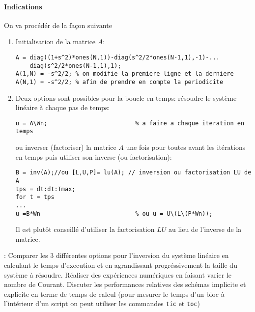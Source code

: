 \documentclass[12pt,a4paper]{article}
\begin{document}
\paragraph{Indications} On va proc\'ed\'er de la fa\c{c}on suivante
\begin{enumerate}
\item Initialisation de la matrice $A$:
\begin{verbatim}
A = diag((1+s^2)*ones(N,1))-diag(s^2/2*ones(N-1,1),-1)-...
    diag(s^2/2*ones(N-1,1),1); 
A(1,N) = -s^2/2; % on modifie la premiere ligne et la derniere
A(N,1) = -s^2/2; % afin de prendre en compte la periodicite    
\end{verbatim}
\item Deux options sont possibles pour la boucle en temps: r\'esoudre
le syst\`eme lin\'eaire \`a chaque pas de temps:
\begin{verbatim}
u = A\Wn;                         % a faire a chaque iteration en temps
\end{verbatim}
 ou inverser (factoriser) la matrice $A$ une fois pour toutes avant les it\'erations en temps puis utiliser son
inverse (ou factorisation):
\begin{verbatim}
B = inv(A);//ou [L,U,P]= lu(A); // inversion ou factorisation LU de A 
tps = dt:dt:Tmax;
for t = tps  
...
u =B*Wn                           % ou u = U\(L\(P*Wn));
\end{verbatim}
Il est plut\^ot conseill\'e d'utiliser la factorisation $LU$ au lieu
de l'inverse de la matrice.
\end{enumerate}

: Comparer les 3 diff\'erentes options pour l'inversion
du syst\`eme lin\'eaire en calculant le temps d'execution et en
agrandissant progr\'essivement la taille du syst\`eme \`a r\'esoudre. R\'ealiser des exp\'eriences num\'eriques en
faisant varier le nombre de Courant. Discuter les performances
relatives des sch\'emas implicite et explicite en terme de temps de calcul (pour mesurer le temps d'un bloc à l'intérieur d'un script on peut utiliser les commandes \texttt{tic} et \texttt{toc})
\end{document}
